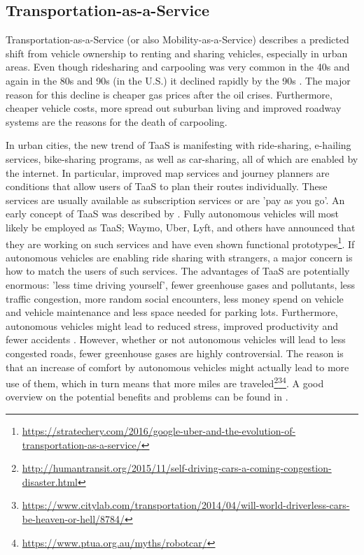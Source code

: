 \subsection{Transportation-as-a-Service}\label{ssec:TaaS}
Transportation-as-a-Service (or also Mobility-as-a-Service) describes a predicted shift from vehicle ownership to renting and sharing vehicles, especially in urban areas. Even though ridesharing and carpooling was very common in the 40s and again in the 80s and 90s (in the U.S.) it declined rapidly by the 90s \citep{Ferguson}. The major reason for this decline is cheaper gas prices after the oil crises. Furthermore, cheaper vehicle costs, more spread out suburban living and improved roadway systems are the reasons for the death of carpooling. 

In urban cities, the new trend of TaaS is manifesting with ride-sharing, e-hailing services, bike-sharing programs, as well as car-sharing, all of which are enabled by the internet. In particular, improved map services and journey planners are conditions that allow users of TaaS to plan their routes individually. These services are usually available as subscription services or are 'pay as you go'. An early concept of TaaS was described by \citet{Tschanz1996TheServices}. Fully autonomous vehicles will most likely be employed as TaaS; Waymo, Uber, Lyft, and others have announced that they are working on such services and have even shown functional prototypes\footnote{\url{https://stratechery.com/2016/google-uber-and-the-evolution-of-transportation-as-a-service/}}. If autonomous vehicles are enabling ride sharing with strangers, a major concern is how to match the users of such services. The advantages of TaaS are potentially enormous: 'less time driving yourself', fewer greenhouse gases and pollutants, less traffic congestion, more random social encounters, less money spend on vehicle and vehicle maintenance and less space needed for parking lots.
Furthermore, autonomous vehicles might lead to reduced stress, improved productivity and fewer accidents \citet{Fagnant2015PreparingRecommendations}. However, whether or not autonomous vehicles will lead to less congested roads, fewer greenhouse gases are highly controversial. The reason is that an increase of comfort by autonomous vehicles might actually lead to more use of them, which in turn means that more miles are traveled\footnote{\url{http://humantransit.org/2015/11/self-driving-cars-a-coming-congestion-disaster.html}}\fnsep\footnote{\url{https://www.citylab.com/transportation/2014/04/will-world-driverless-cars-be-heaven-or-hell/8784/}}\fnsep\footnote{\url{https://www.ptua.org.au/myths/robotcar/}}. A good overview on the potential benefits and problems can be found in \citet{Litman2014AutonomousPlanning}. 

